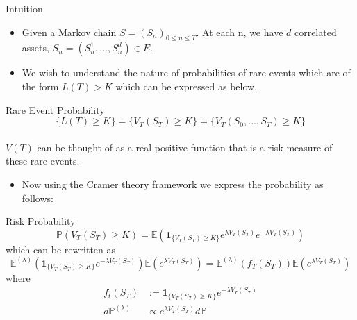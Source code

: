 \begin{frame}{Intuition}
	\begin{itemize}
		\item Given a Markov chain $S=(S_n)_{0 \leq n \leq T}$. At each n, we have 
		      $d$ correlated assets, $S_n = (S_n^1,...,S_n^d) \in \mathit{E}$. 
		\item We wish to understand the nature of probabilities of rare events 
		      which are of the form $L(T) > K$ which can be expressed as below.
	\end{itemize}
	\begin{block}{Rare Event Probability}
		$$\{L(T) \geq K\} = \{V_T(S_T)\geq K\} = \{V_T(S_0,...,S_T)\geq K\}$$\\
		$V(T)$ can be thought of as a real positive function that is a risk measure of these rare events.
	\end{block}
\end{frame}

\begin{frame}
	\begin{itemize}
		\item Now using the Cramer theory framework we express the probability
		      as follows:
	\end{itemize}
	\begin{block}{Risk Probability}
		\begin{equation*}
			\mathbb{P}(V_T(S_T) \geq K) = \mathbb{E}\left( \mathbf{1}_{\{V_T(S_T) \geq K\}}e^{\lambda V_T(S_T)}e^{-\lambda V_T(S_T)} \right)
		\end{equation*}
		which can be rewritten as
		\begin{equation*}
			\mathbb{E}^{(\lambda)} \left(  \mathbf{1}_{\{V_T(S_T) \geq K\}} e^{-\lambda V_T(S_T)} \right) \mathbb{E} \left(e^{\lambda V_T(S_T)}\right) = 
			\mathbb{E}^{(\lambda)}(f_T(S_T)) \mathbb{E}(e^{\lambda V_T(S_T)})
		\end{equation*}
		where 
		\begin{equation*}
			\begin{split}
				f_t(S_T) &:= \mathbf{1}_{\{V_T(S_T) \geq K\}}e^{-\lambda V_T(S_T)} \\
				d\mathbb{P}^{(\lambda)} &\propto e^{\lambda V_T(S_T)}d\mathbb{P}
			\end{split}
		\end{equation*}
	\end{block}
\end{frame}
		
